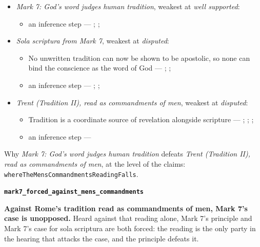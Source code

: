 \documentclass[11pt]{article}
\begin{document}
\begin{itemize}
\item \emph{Mark 7: God’s word judges human tradition}, weakest at \emph{well supported}:
\begin{itemize}
\item an inference step --- \cite[Vatican II (1965), Dei Verbum 10]{tanner-decrees-1990}; \cite[IV.x.23]{calvin-institutes-1960}; \cite[15--16]{wenham-our-lords-view-1953}
\end{itemize}
\item \emph{Sola scriptura from Mark 7}, weakest at \emph{disputed}:
\begin{itemize}
\item No unwritten tradition can now be shown to be apostolic, so none can bind the conscience as the word of God --- \cite[503--511]{whitaker-disputation-1849}; \cite[594]{whitaker-disputation-1849}; \cite[I.6]{westminster-confession-1647}
\item an inference step --- \cite{geiselmann-meaning-of-tradition-1966}; \cite[Vatican I (1870), Pastor Aeternus, ch. 4]{tanner-decrees-1990}; \cite{florovsky-bible-church-tradition-1972}
\end{itemize}
\item \emph{Trent (Tradition II), read as commandments of men}, weakest at \emph{disputed}:
\begin{itemize}
\item Tradition is a coordinate source of revelation alongside scripture --- \cite[Trent, Session IV (1546), Decree on Sacred Books and Traditions]{tanner-decrees-1990}; \cite{mathison-shape-sola-scriptura-2001}; \cite{geiselmann-meaning-of-tradition-1966}; \cite{congar-tradition-and-traditions-1966}
\item an inference step --- \cite[IV.x.23]{calvin-institutes-1960}
\end{itemize}
\end{itemize}
\noindent Why \emph{Mark 7: God’s word judges human tradition} defeats \emph{Trent (Tradition II), read as commandments of men}, at the level of the claims: \texttt{where\allowbreak{}The\allowbreak{}Mens\allowbreak{}Commandments\allowbreak{}Reading\allowbreak{}Falls}.
\par\medskip\noindent\textbf{\texttt{mark7\_\allowbreak{}forced\_\allowbreak{}against\_\allowbreak{}mens\_\allowbreak{}commandments}}\par\nobreak\noindent
\textbf{Against Rome’s tradition read as commandments of men, Mark 7’s case is unopposed.} Heard against that reading alone, Mark 7’s principle and Mark 7’s case for sola scriptura are both forced: the reading is the only party in the hearing that attacks the case, and the principle defeats it.
\end{document}
